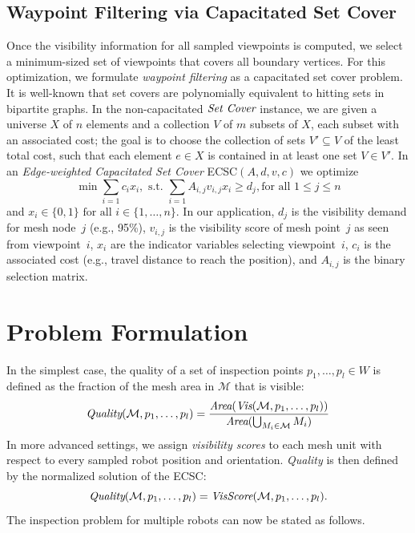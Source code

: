 \documentclass[letterpaper, 10 pt, conference]{ieeeconf}  %
\begin{document}
\subsection{Waypoint Filtering via Capacitated Set Cover}

Once the visibility information for all sampled viewpoints is computed, we select a minimum-sized set of viewpoints that covers all boundary vertices. 
For this optimization, we formulate \emph{waypoint filtering} as a capacitated set cover problem. It is well-known that set covers are polynomially equivalent to hitting sets in bipartite graphs.
In the non-capacitated $\mbox {\em Set  Cover}$ instance, we are given a universe $X$ of $n$ elements and a collection $V$ of $m$ subsets of $X$, each subset with an associated cost; the goal is
to choose the collection of sets $V' \subseteq V$ of the least total cost, such that each element $e \in X$ is
contained in at least one set $V \in V'$. 
%
In an \emph{Edge-weighted Capacitated Set Cover} ECSC$(A, d, v, c)$ we optimize $$\min \sum_{i=1} c_i x_i,\mbox{ s.t. } 
\sum_{i=1} A_{i,j} v_{i,j} x_i \ge d_j, \mbox{for all } 1 \le j \le n$$ 
and 
$x_i \in 
\{0, 1\} \mbox{ for all } i \in \{1,\ldots,n\}$. In our application, $d_j$ is the visibility demand for mesh node~$j$ (e.g., 95\%), $v_{i,j}$ is the visibility score of mesh point~$j$ as seen from viewpoint~$i$, $x_i$ are the indicator variables selecting viewpoint~$i$, $c_i$ is the associated cost (e.g., travel distance to reach the position), and $A_{i,j}$ is the binary selection matrix.

\section{Problem Formulation}

In the simplest case, the quality of a set of inspection points 
$p_1 ,\ldots,p_l \in W$ is defined as the
fraction of the mesh area in $\mathcal{M}$ that is visible:
$$
\mbox{\em Quality}(\mathcal{M}, p_1,\ldots,p_l) = \frac{\mbox{\em Area}(\mbox{\em Vis}(\mathcal{M}, p_1 ,\ldots,p_l)) 
}
{\mbox{\em Area}(\bigcup_{M_i \in \mathcal{M}} M_i)}$$
In more advanced settings, we assign \emph{visibility scores} to each 
mesh unit with respect to every sampled robot
position and orientation. 
\emph{Quality} is then defined by the normalized 
solution of the ECSC:
$$
\mbox{\em Quality}(\mathcal{M}, p_1,\ldots,p_l) = \mbox{\em VisScore}(\mathcal{M}, p_1 ,\ldots,p_l).$$
The inspection problem for multiple robots can now be stated as follows.
\end{document}
